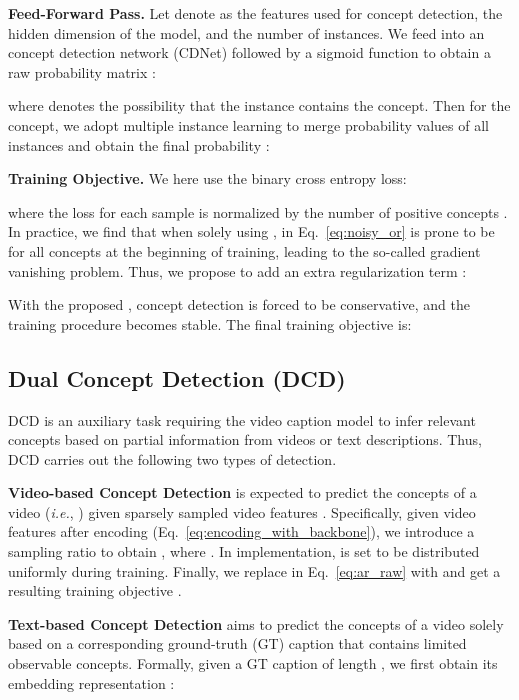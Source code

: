 \documentclass[runningheads]{llncs}
\newcommand\ie{\textit{i.e.}}
\begin{document}
\noindent\textbf{Feed-Forward Pass.} Let denote  as the features used for concept detection,  the hidden dimension of the model, and  the number of instances. We feed  into an concept detection network (CDNet) followed by a sigmoid function to obtain a raw probability matrix :

where  denotes the possibility that the  instance contains the  concept. Then for the  concept, we adopt multiple instance learning to merge probability values of all  instances and obtain the final probability :



\noindent\textbf{Training Objective.} We here use the binary cross entropy loss:

where the loss for each sample is normalized by the number of positive concepts . In practice, we find that when solely using ,  in Eq.~\ref{eq:noisy_or} is prone to be  for all concepts at the beginning of training, leading to the so-called gradient vanishing problem. Thus, we propose to add an extra regularization term :



With the proposed , concept detection is forced to be conservative, and the training procedure becomes stable. The final training objective  is:

 

\subsection{Dual Concept Detection (DCD)}
\label{sec:approach_DCD}
DCD is an auxiliary task requiring the video caption model to infer relevant concepts based on partial information from videos or text descriptions. Thus, DCD carries out the following two types of detection.

\noindent\textbf{Video-based Concept Detection} is expected to predict the concepts of a video (\ie{}, ) given sparsely sampled video features . Specifically, given video features  after encoding (Eq.~\ref{eq:encoding_with_backbone}), we introduce a sampling ratio  to obtain , where . In implementation,  is set to be distributed uniformly during training. Finally, we replace  in Eq.~\ref{eq:ar_raw} with  and get a resulting training objective .

\noindent\textbf{Text-based Concept Detection} aims to predict the concepts of a video solely based on a corresponding ground-truth (GT) caption that contains limited observable concepts. Formally, given a GT caption  of length , we first obtain its embedding representation :
\end{document}
